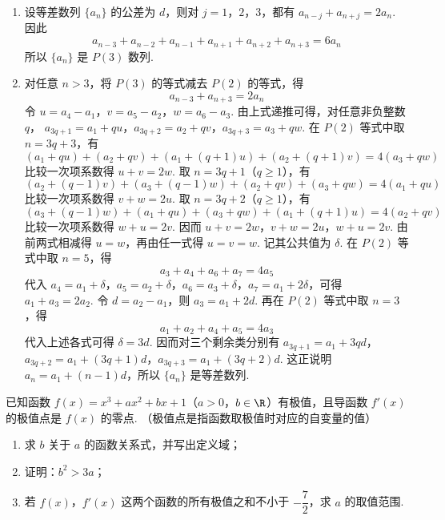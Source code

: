 \begin{solution}
\begin{enumerate}
\item 设等差数列 \(\{a_n\}\) 的公差为 \(d\)，则对 \(j=1\)，\(2\)，\(3\)，都有 \(a_{n-j}+a_{n+j}=2a_n\). 因此
\[
a_{n-3}+a_{n-2}+a_{n-1}+a_{n+1}+a_{n+2}+a_{n+3}=6a_n
\]
所以 \(\{a_n\}\) 是 \(P(3)\) 数列.
\item 对任意 \(n>3\)，将 \(P(3)\) 的等式减去 \(P(2)\) 的等式，得
\[
a_{n-3}+a_{n+3}=2a_n
\]
令 \(u=a_4-a_1\)，\(v=a_5-a_2\)，\(w=a_6-a_3\). 由上式递推可得，对任意非负整数 \(q\)，
\(a_{3q+1}=a_1+qu\)，\(a_{3q+2}=a_2+qv\)，\(a_{3q+3}=a_3+qw\).
在 \(P(2)\) 等式中取 \(n=3q+3\)，有
\[
(a_1+qu)+(a_2+qv)+(a_1+(q+1)u)+(a_2+(q+1)v)=4(a_3+qw)
\]
比较一次项系数得 \(u+v=2w\). 取 \(n=3q+1\)（\(q\ge1\)），有
\[
(a_2+(q-1)v)+(a_3+(q-1)w)+(a_2+qv)+(a_3+qw)=4(a_1+qu)
\]
比较一次项系数得 \(v+w=2u\). 取 \(n=3q+2\)（\(q\ge1\)），有
\[
(a_3+(q-1)w)+(a_1+qu)+(a_3+qw)+(a_1+(q+1)u)=4(a_2+qv)
\]
比较一次项系数得 \(w+u=2v\). 因而
\(u+v=2w\)，\(v+w=2u\)，\(w+u=2v\).
由前两式相减得 \(u=w\)，再由任一式得 \(u=v=w\). 记其公共值为 \(\delta\). 在 \(P(2)\) 等式中取 \(n=5\)，得
\[
a_3+a_4+a_6+a_7=4a_5
\]
代入 \(a_4=a_1+\delta\)，\(a_5=a_2+\delta\)，\(a_6=a_3+\delta\)，\(a_7=a_1+2\delta\)，可得 \(a_1+a_3=2a_2\). 令 \(d=a_2-a_1\)，则 \(a_3=a_1+2d\). 再在 \(P(2)\) 等式中取 \(n=3\)，得
\[
a_1+a_2+a_4+a_5=4a_3
\]
代入上述各式可得 \(\delta=3d\). 因而对三个剩余类分别有
\(a_{3q+1}=a_1+3qd\)，\(a_{3q+2}=a_1+(3q+1)d\)，\(a_{3q+3}=a_1+(3q+2)d\).
这正说明 \(a_n=a_1+(n-1)d\)，所以 \(\{a_n\}\) 是等差数列.
\end{enumerate}
\end{solution}


\begin{problem}
已知函数 \(f(x)=x^3+ax^2+bx+1\)（\(a>0\)，\(b\in\R\)）有极值，且导函数 \(f'(x)\) 的极值点是 \(f(x)\) 的零点. （极值点是指函数取极值时对应的自变量的值）

\begin{enumerate}
\item 求 \(b\) 关于 \(a\) 的函数关系式，并写出定义域；
\item 证明：\(b^2>3a\)；
\item 若 \(f(x)\)，\(f'(x)\) 这两个函数的所有极值之和不小于 \(-\dfrac72\)，求 \(a\) 的取值范围.
\end{enumerate}
\end{problem}

